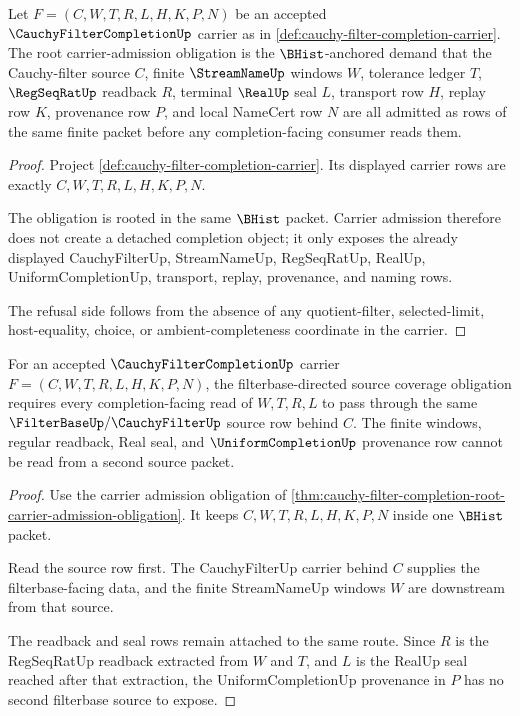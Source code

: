 \begin{theorem}
\label{thm:cauchy-filter-completion-root-carrier-admission-obligation}
Let $F=(C,W,T,R,L,H,K,P,N)$ be an accepted $\CauchyFilterCompletionUp$ carrier as in \autoref{def:cauchy-filter-completion-carrier}. The root carrier-admission obligation is the $\BHist$-anchored demand that the Cauchy-filter source $C$, finite $\StreamNameUp$ windows $W$, tolerance ledger $T$, $\RegSeqRatUp$ readback $R$, terminal $\RealUp$ seal $L$, transport row $H$, replay row $K$, provenance row $P$, and local NameCert row $N$ are all admitted as rows of the same finite packet before any completion-facing consumer reads them.
\end{theorem}
\begin{proof}
Project \autoref{def:cauchy-filter-completion-carrier}. Its displayed carrier rows are exactly $C,W,T,R,L,H,K,P,N$.

The obligation is rooted in the same $\BHist$ packet. Carrier admission therefore does not create a detached completion object; it only exposes the already displayed CauchyFilterUp, StreamNameUp, RegSeqRatUp, RealUp, UniformCompletionUp, transport, replay, provenance, and naming rows.

The refusal side follows from the absence of any quotient-filter, selected-limit, host-equality, choice, or ambient-completeness coordinate in the carrier.
\end{proof}

\begin{theorem}
\label{thm:cauchy-filter-completion-root-filterbase-source-coverage-obligation}
For an accepted $\CauchyFilterCompletionUp$ carrier $F=(C,W,T,R,L,H,K,P,N)$, the filterbase-directed source coverage obligation requires every completion-facing read of $W,T,R,L$ to pass through the same $\FilterBaseUp/\CauchyFilterUp$ source row behind $C$. The finite windows, regular readback, Real seal, and $\UniformCompletionUp$ provenance row cannot be read from a second source packet.
\end{theorem}
\begin{proof}
Use the carrier admission obligation of \autoref{thm:cauchy-filter-completion-root-carrier-admission-obligation}. It keeps $C,W,T,R,L,H,K,P,N$ inside one $\BHist$ packet.

Read the source row first. The CauchyFilterUp carrier behind $C$ supplies the filterbase-facing data, and the finite StreamNameUp windows $W$ are downstream from that source.

The readback and seal rows remain attached to the same route. Since $R$ is the RegSeqRatUp readback extracted from $W$ and $T$, and $L$ is the RealUp seal reached after that extraction, the UniformCompletionUp provenance in $P$ has no second filterbase source to expose.
\end{proof}

